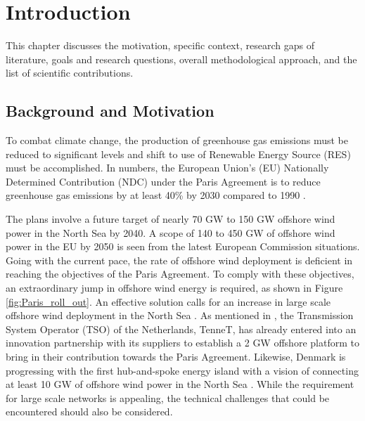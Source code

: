 \chapter{Introduction}\label{1}

This chapter discusses the motivation, specific context, research gaps of literature, goals and research questions, overall methodological approach, and the list of scientific contributions.

\section{Background and Motivation}\label{Background}

To combat climate change, the production of greenhouse gas emissions must be reduced to significant levels and shift to use of Renewable Energy Source (\gls{RES}) must be accomplished. In numbers, the European Union's (\gls{EU}) Nationally Determined Contribution (NDC) under the Paris Agreement is to reduce greenhouse gas emissions by at least 40\% by 2030 compared to 1990 \cite{agreement2015unfccc}. 

The plans involve a future target of nearly 70 GW to 150 GW offshore wind power in the North Sea by 2040. A scope of 140 to 450 GW of offshore wind power in the \gls{EU} by 2050 is seen from the latest European Commission situations. Going with the current pace, the rate of offshore wind deployment is deficient in reaching the objectives of the Paris Agreement. To comply with these objectives, an extraordinary jump in offshore wind energy is required, as shown in Figure \ref{fig:Paris_roll_out}. An effective solution calls for an increase in large scale offshore wind deployment in the North Sea \cite{noauthor_vision_nodate}. As mentioned in \cite{noauthor_tennet_2020}, the Transmission System Operator (TSO) of the Netherlands, TenneT, has already entered into an innovation partnership with its suppliers to establish a 2 GW offshore platform to bring in their contribution towards the Paris Agreement. Likewise, Denmark is progressing with the first hub-and-spoke energy island with a vision of connecting at least 10 GW of offshore wind power in the North Sea \cite{noauthor_first_nodate}. While the requirement for large scale networks is appealing, the technical challenges that could be encountered should also be considered.  

